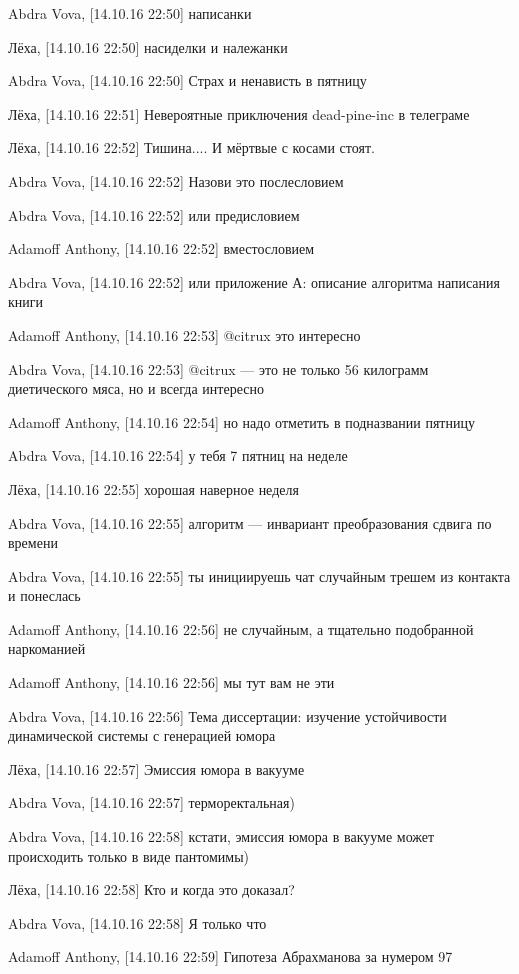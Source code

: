 Abdra Vova, [14.10.16 22:50]
написанки

Лёха, [14.10.16 22:50]
насиделки и належанки

Abdra Vova, [14.10.16 22:50]
Страх и ненависть в пятницу

Лёха, [14.10.16 22:51]
Невероятные приключения dead-pine-inc в телеграме

Лёха, [14.10.16 22:52]
Тишина....
И мёртвые с косами стоят.

Abdra Vova, [14.10.16 22:52]
Назови это послесловием

Abdra Vova, [14.10.16 22:52]
или предисловием

Adamoff Anthony, [14.10.16 22:52]
вместословием

Abdra Vova, [14.10.16 22:52]
или приложение А: описание алгоритма написания книги

Adamoff Anthony, [14.10.16 22:53]
@citrux это интересно

Abdra Vova, [14.10.16 22:53]
@citrux — это не только 56 килограмм диетического мяса, но и всегда интересно

Adamoff Anthony, [14.10.16 22:54]
но надо отметить в подназвании пятницу

Abdra Vova, [14.10.16 22:54]
у тебя 7 пятниц на неделе

Лёха, [14.10.16 22:55]
хорошая наверное неделя

Abdra Vova, [14.10.16 22:55]
алгоритм — инвариант преобразования сдвига по времени

Abdra Vova, [14.10.16 22:55]
ты инициируешь чат случайным трешем из контакта и понеслась

Adamoff Anthony, [14.10.16 22:56]
не случайным, а тщательно подобранной наркоманией

Adamoff Anthony, [14.10.16 22:56]
мы тут вам не эти

Abdra Vova, [14.10.16 22:56]
Тема диссертации: изучение устойчивости динамической системы с генерацией юмора

Лёха, [14.10.16 22:57]
Эмиссия юмора в вакууме

Abdra Vova, [14.10.16 22:57]
терморектальная)

Abdra Vova, [14.10.16 22:58]
кстати, эмиссия юмора в вакууме может происходить только в виде пантомимы)

Лёха, [14.10.16 22:58]
Кто и когда это доказал?

Abdra Vova, [14.10.16 22:58]
Я только что

Adamoff Anthony, [14.10.16 22:59]
Гипотеза Абрахманова за нумером 97


